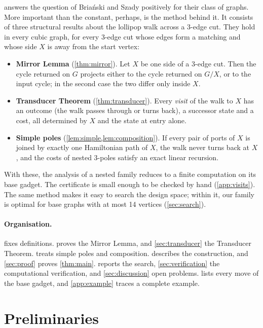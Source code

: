 \documentclass[11pt]{article}
\theoremstyle{definition}
\begin{document}
 answers the question of Bria\'nski and Szady positively for their class of
graphs. More important than the constant, perhaps, is the method behind it. It consists of three
structural results about the lollipop walk across a 3-edge cut. They hold in every cubic graph,
for every 3-edge cut whose edges form a matching and whose side $X$ is away from the start
vertex:
\begin{itemize}
\item \textbf{Mirror Lemma} (\cref{thm:mirror}). Let $X$ be one side of a 3-edge cut. Then the
cycle returned on $G$ projects either to the cycle returned on $G/X$, or to the input cycle; in the
second case the two differ only inside $X$.
\item \textbf{Transducer Theorem} (\cref{thm:transducer}). Every \emph{visit} of the walk to $X$
has an outcome (the walk passes through or turns back), a successor state and a cost, all
determined by $X$ and the state at entry alone.
\item \textbf{Simple poles} (\cref{lem:simple,lem:composition}). If every pair of ports of $X$ is
joined by exactly one Hamiltonian path of $X$, the walk never turns back at $X$, and the costs of
nested 3-poles satisfy an exact linear recursion.
\end{itemize}
With these, the analysis of a nested family reduces to a finite computation on its base gadget.
The certificate is small enough to be checked by hand (\cref{app:visits}). The same method makes
it easy to search the design space; within it, our family is optimal for base graphs with at most
14 vertices (\cref{sec:search}).

\paragraph{Organisation.}  fixes definitions.  proves the
Mirror Lemma, and \cref{sec:transducer} the Transducer Theorem.  treats simple
poles and composition.  describes the construction, and \cref{sec:proof}
proves \cref{thm:main}.  reports the search, \cref{sec:verification} the
computational verification, and \cref{sec:discussion} open problems.  lists every
move of the base gadget, and \cref{app:example} traces a complete example.

\section{Preliminaries}\label{sec:prelim}
\end{document}
